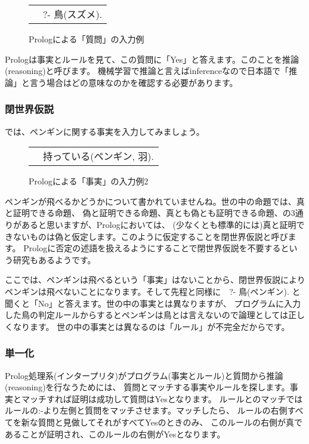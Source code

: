 \documentclass[a4j,dvipdfmx]{jsarticle}
\newcommand{\fixed}[1]{{\ttfamily #1}}
\begin{document}
\begin{figure}[htbp]
\centering
\begin{tabular}{l}
{\fixed 　?- 鳥(スズメ). } 
\end{tabular}
\caption{Prologによる「質問」の入力例}
\label{fig:query}
\end{figure}

Prologは事実とルールを見て、この質問に「Yes」と答えます。このことを推論(reasoning)と呼びます。
機械学習で推論と言えばinferenceなので日本語で「推論」と言う場合はどの意味なのかを確認する必要があります。

\subsubsection{閉世界仮説}
では、ペンギンに関する事実を入力してみましょう。
\begin{figure}[htbp]
\centering
\begin{tabular}{l}
{\fixed 　持っている(ペンギン, 羽). } 
\end{tabular}
\caption{Prologによる「事実」の入力例2}
\label{fig:fact2}
\end{figure}
ペンギンが飛べるかどうかについて書かれていませんね。世の中の命題では、真と証明できる命題、
偽と証明できる命題、真とも偽とも証明できる命題、の3通りがあると思いますが、Prologにおいては、
(少なくとも標準的には)真と証明できないものは偽と仮定します。このように仮定することを閉世界仮説と呼びます。
Prologに否定の述語を扱えるようにすることで閉世界仮説を不要するという研究もあるようです。

ここでは、ペンギンは飛べるという「事実」はないことから、閉世界仮説によりペンギンは飛べないことになります。そして先程と同様に{\fixed 　?- 鳥(ペンギン). } と聞くと「No」と答えます。世の中の事実とは異なりますが、
プログラムに入力した鳥の判定ルールからするとペンギンは鳥とは言えないので論理としては正しくなります。
世の中の事実とは異なるのは「ルール」が不完全だからです。

\subsubsection{単一化}
Prolog処理系(インタープリタ)がプログラム(事実とルール)と質問から推論(reasoning)を行なうためには、
質問とマッチする事実やルールを探します。事実とマッチすれば証明は成功して質問はYesとなります。
ルールとのマッチではルールの{\fixed :-}より左側と質問をマッチさせます。マッチしたら、
ルールの右側すべてを新な質問と見做してそれがすべてYesのときのみ、
このルールの右側が真であることが証明され、このルールの右側がYesとなります。
\end{document}
